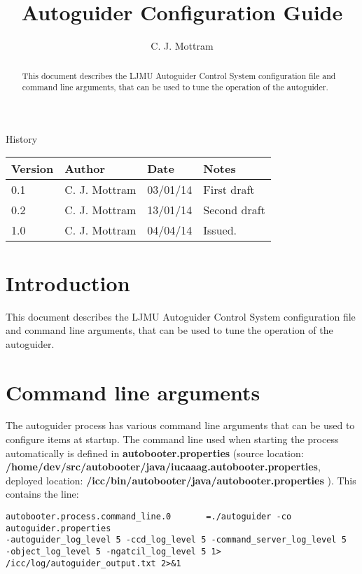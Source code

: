 \documentclass[10pt,a4paper]{article}
\title{Autoguider Configuration Guide}
\author{C. J. Mottram}
\date{}
\begin{document}
\thispagestyle{empty}
\maketitle
\begin{abstract}
This document describes the LJMU Autoguider Control System configuration file and command line arguments, that can be used to tune the operation of the autoguider.
\end{abstract}
\centerline{\Large History}
\begin{center}
\begin{tabular}{|l|l|l|p{15em}|}
\hline
{\bf Version} & {\bf Author} & {\bf Date} & {\bf Notes} \\
\hline
0.1 & C. J. Mottram & 03/01/14 & First draft \\
0.2 & C. J. Mottram & 13/01/14 & Second draft \\
1.0 & C. J. Mottram & 04/04/14 & Issued. \\
\hline
\end{tabular}
\end{center}

\newpage
\tableofcontents
\listoffigures
\listoftables
\newpage

\section{Introduction}

This document describes the LJMU Autoguider Control System configuration file and command line arguments, that can be used to tune the operation of the autoguider.

\section{Command line arguments}

The autoguider process has various command line arguments that can be used to configure items at startup. The command
line used when starting the process automatically is defined in {\bf autobooter.properties} (source location: {\bf /home/dev/src/autobooter/java/iucaaag.autobooter.properties}, deployed location: {\bf /icc/bin/autobooter/java/autobooter.properties} ). This contains the line:

\begin{verbatim}
autobooter.process.command_line.0       =./autoguider -co autoguider.properties 
-autoguider_log_level 5 -ccd_log_level 5 -command_server_log_level 5 
-object_log_level 5 -ngatcil_log_level 5 1> /icc/log/autoguider_output.txt 2>&1
\end{verbatim}
\end{document}
